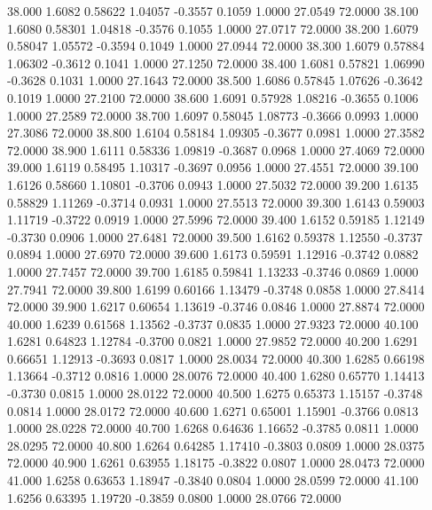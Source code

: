   38.000   1.6082   0.58622   1.04057  -0.3557   0.1059   1.0000  27.0549  72.0000
  38.100   1.6080   0.58301   1.04818  -0.3576   0.1055   1.0000  27.0717  72.0000
  38.200   1.6079   0.58047   1.05572  -0.3594   0.1049   1.0000  27.0944  72.0000
  38.300   1.6079   0.57884   1.06302  -0.3612   0.1041   1.0000  27.1250  72.0000
  38.400   1.6081   0.57821   1.06990  -0.3628   0.1031   1.0000  27.1643  72.0000
  38.500   1.6086   0.57845   1.07626  -0.3642   0.1019   1.0000  27.2100  72.0000
  38.600   1.6091   0.57928   1.08216  -0.3655   0.1006   1.0000  27.2589  72.0000
  38.700   1.6097   0.58045   1.08773  -0.3666   0.0993   1.0000  27.3086  72.0000
  38.800   1.6104   0.58184   1.09305  -0.3677   0.0981   1.0000  27.3582  72.0000
  38.900   1.6111   0.58336   1.09819  -0.3687   0.0968   1.0000  27.4069  72.0000
  39.000   1.6119   0.58495   1.10317  -0.3697   0.0956   1.0000  27.4551  72.0000
  39.100   1.6126   0.58660   1.10801  -0.3706   0.0943   1.0000  27.5032  72.0000
  39.200   1.6135   0.58829   1.11269  -0.3714   0.0931   1.0000  27.5513  72.0000
  39.300   1.6143   0.59003   1.11719  -0.3722   0.0919   1.0000  27.5996  72.0000
  39.400   1.6152   0.59185   1.12149  -0.3730   0.0906   1.0000  27.6481  72.0000
  39.500   1.6162   0.59378   1.12550  -0.3737   0.0894   1.0000  27.6970  72.0000
  39.600   1.6173   0.59591   1.12916  -0.3742   0.0882   1.0000  27.7457  72.0000
  39.700   1.6185   0.59841   1.13233  -0.3746   0.0869   1.0000  27.7941  72.0000
  39.800   1.6199   0.60166   1.13479  -0.3748   0.0858   1.0000  27.8414  72.0000
  39.900   1.6217   0.60654   1.13619  -0.3746   0.0846   1.0000  27.8874  72.0000
  40.000   1.6239   0.61568   1.13562  -0.3737   0.0835   1.0000  27.9323  72.0000
  40.100   1.6281   0.64823   1.12784  -0.3700   0.0821   1.0000  27.9852  72.0000
  40.200   1.6291   0.66651   1.12913  -0.3693   0.0817   1.0000  28.0034  72.0000
  40.300   1.6285   0.66198   1.13664  -0.3712   0.0816   1.0000  28.0076  72.0000
  40.400   1.6280   0.65770   1.14413  -0.3730   0.0815   1.0000  28.0122  72.0000
  40.500   1.6275   0.65373   1.15157  -0.3748   0.0814   1.0000  28.0172  72.0000
  40.600   1.6271   0.65001   1.15901  -0.3766   0.0813   1.0000  28.0228  72.0000
  40.700   1.6268   0.64636   1.16652  -0.3785   0.0811   1.0000  28.0295  72.0000
  40.800   1.6264   0.64285   1.17410  -0.3803   0.0809   1.0000  28.0375  72.0000
  40.900   1.6261   0.63955   1.18175  -0.3822   0.0807   1.0000  28.0473  72.0000
  41.000   1.6258   0.63653   1.18947  -0.3840   0.0804   1.0000  28.0599  72.0000
  41.100   1.6256   0.63395   1.19720  -0.3859   0.0800   1.0000  28.0766  72.0000
